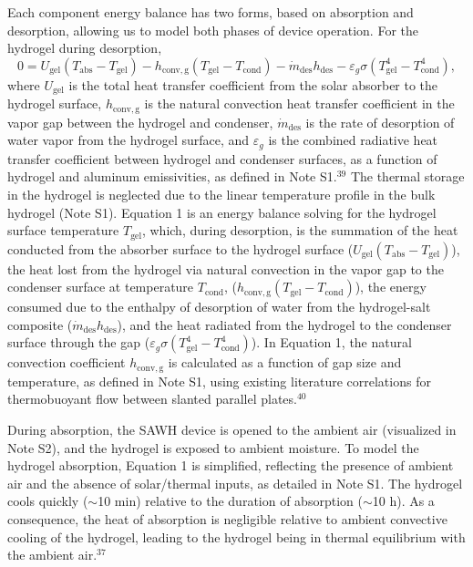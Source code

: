 \documentclass[11pt]{article}
\begin{document}
Each component energy balance has two forms, based on absorption and desorption, allowing us to model both phases of device operation. For the hydrogel during desorption,
\begin{equation}
0 = U_{\mathrm{gel}}\left(T_{\mathrm{abs}} - T_{\mathrm{gel}}\right) - h_{\mathrm{conv,g}}\left(T_{\mathrm{gel}} - T_{\mathrm{cond}}\right) - \dot{m}_{\mathrm{des}} h_{\mathrm{des}} - \varepsilon_{g}\sigma\left(T_{\mathrm{gel}}^{4} - T_{\mathrm{cond}}^{4}\right),
\end{equation}
where $U_{\mathrm{gel}}$ is the total heat transfer coefficient from the solar absorber to the hydrogel surface, $h_{\mathrm{conv,g}}$ is the natural convection heat transfer coefficient in the vapor gap between the hydrogel and condenser, $\dot{m}_{\mathrm{des}}$ is the rate of desorption of water vapor from the hydrogel surface, and $\varepsilon_{g}$ is the combined radiative heat transfer coefficient between hydrogel and condenser surfaces, as a function of hydrogel and aluminum emissivities, as defined in Note S1.$^{39}$ The thermal storage in the hydrogel is neglected due to the linear temperature profile in the bulk hydrogel (Note S1). Equation 1 is an energy balance solving for the hydrogel surface temperature $T_{\mathrm{gel}}$, which, during desorption, is the summation of the heat conducted from the absorber surface to the hydrogel surface ($U_{\mathrm{gel}}(T_{\mathrm{abs}} - T_{\mathrm{gel}})$), the heat lost from the hydrogel via natural convection in the vapor gap to the condenser surface at temperature $T_{\mathrm{cond}}$, ($h_{\mathrm{conv,g}}(T_{\mathrm{gel}} - T_{\mathrm{cond}})$), the energy consumed due to the enthalpy of desorption of water from the hydrogel-salt composite ($\dot{m}_{\mathrm{des}}h_{\mathrm{des}}$), and the heat radiated from the hydrogel to the condenser surface through the gap ($\varepsilon_{g}\sigma(T_{\mathrm{gel}}^{4} - T_{\mathrm{cond}}^{4})$). In Equation 1, the natural convection coefficient $h_{\mathrm{conv,g}}$ is calculated as a function of gap size and temperature, as defined in Note S1, using existing literature correlations for thermobuoyant flow between slanted parallel plates.$^{40}$

During absorption, the SAWH device is opened to the ambient air (visualized in Note S2), and the hydrogel is exposed to ambient moisture. To model the hydrogel absorption, Equation 1 is simplified, reflecting the presence of ambient air and the absence of solar/thermal inputs, as detailed in Note S1. The hydrogel cools quickly ($\sim$10 min) relative to the duration of absorption ($\sim$10 h). As a consequence, the heat of absorption is negligible relative to ambient convective cooling of the hydrogel, leading to the hydrogel being in thermal equilibrium with the ambient air.$^{37}$
\end{document}
